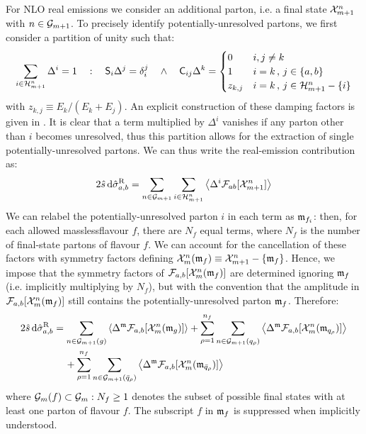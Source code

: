 For NLO real emissions we consider an additional parton, i.e. a final state $ \mathcal{X}^{n}_{m+1} $ with $ n \in \mathcal{G}_{m+1} $. To precisely identify potentially-unresolved partons, we first consider a partition of unity such that:
\begin{equation}
  \sum_{i \in \mathcal{H}^{n}_{m+1}} \Delta^i = 1
  \quad : \quad
  \mathsf{S}_i \Delta^j = \delta_i^j
  \quad \land \quad
  \mathsf{C}_{ij} \Delta^k =
  \begin{cases}
    0 & i,j \neq k \\
    1 & i = k \,,\, j \in \{a,b\} \\
    z_{k,j} & i = k \,,\, j \in \mathcal{H}^{n}_{m+1} - \{i\}
  \end{cases}
  \label{eq:delta-part}
\end{equation}
with $ z_{k,j} \equiv E_k / (E_k + E_j) $. An explicit construction of these damping factors is given in . It is clear that a term multiplied by $ \Delta^i $ vanishes if any parton other than $ i $ becomes unresolved, thus this partition allows for the extraction of single potentially-unresolved partons. We can thus write the real-emission contribution as:
\begin{equation*}
  2\hat{s}\, \mathrm{d}\hat{\sigma}_{a,b}^\text{R} = \sum_{n \in \mathcal{G}_{m+1}} \sum_{i \in \mathcal{H}^{n}_{m+1}} \left\langle \Delta^i \mathcal{F}_{ab}[\mathcal{X}^{n}_{m+1}] \right\rangle
\end{equation*}
We can relabel the potentially-unresolved parton $ i $ in each term as $ \mathfrak{m}_{f_i} $: then, for each allowed massless\footnotemark flavour $ f $, there are $ N_f $ equal terms, where $ N_f $ is the number of final-state partons of flavour $ f $. We can account for the cancellation of these factors with symmetry factors defining $ \mathcal{X}^{n}_{m}(\mathfrak{m}_f) \equiv \mathcal{X}^{n}_{m+1} - \{\mathfrak{m}_f\} $. Hence, we impose that the symmetry factors of $ \mathcal{F}_{a,b}[\mathcal{X}^{n}_{m}(\mathfrak{m}_f)] $ are determined ignoring $ \mathfrak{m}_f $ (i.e. implicitly multiplying by $ N_f $), but with the convention that the amplitude in $ \mathcal{F}_{a,b}[\mathcal{X}^{n}_{m}(\mathfrak{m}_f)] $ still contains the potentially-unresolved parton $ \mathfrak{m}_f $. Therefore:
\begin{equation}
  \begin{split}
    2\hat{s}\, \mathrm{d}\hat{\sigma}_{a,b}^\text{R}
    & = \sum_{n \in \mathcal{G}_{m+1}(g)} \left\langle \Delta^{\mathfrak{m}} \mathcal{F}_{a,b}[\mathcal{X}^{n}_{m}(\mathfrak{m}_g)] \right\rangle + \sum_{\rho = 1}^{n_f} \sum_{n \in \mathcal{G}_{m+1}(q_\rho)} \left\langle \Delta^{\mathfrak{m}} \mathcal{F}_{a,b}[\mathcal{X}^{n}_{m}(\mathfrak{m}_{q_\rho})] \right\rangle \\
    & \quad\, + \sum_{\rho = 1}^{n_f} \sum_{n \in \mathcal{G}_{m+1}(\bar{q}_\rho)} \left\langle \Delta^{\mathfrak{m}} \mathcal{F}_{a,b}[\mathcal{X}^{n}_{m}(\mathfrak{m}_{\bar{q}_\rho})] \right\rangle
  \end{split}
  \label{eq:part-chan}
\end{equation}
where $ \mathcal{G}_m(f) \subset \mathcal{G}_m : N_f \ge 1 $ denotes the subset of possible final states with at least one parton of flavour $ f $. The subscript $ f $ in $ \mathfrak{m}_f $ is suppressed when implicitly understood.

